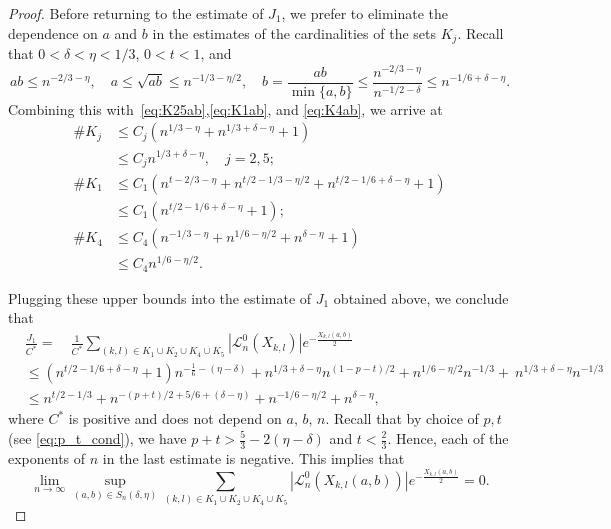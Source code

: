 \documentclass[10pt,a4paper]{amsart}
\begin{document}
\begin{proof}
    Before returning to the estimate of $J_1$, we prefer to eliminate the dependence on $a$ and $b$ in the estimates of the cardinalities of the sets $K_j$. Recall that $0<\delta<\eta<1/3$, $0<t<1$, and 
    \begin{equation}\label{eq:ab_bounds_revisited}
        ab \leq n^{-2/3-\eta}, \quad a \leq \sqrt{ab} \leq n^{-1/3 - \eta/2}, \quad b = \frac{ab}{\min\{a,b\}} \leq \frac{n^{-2/3-\eta}}{n^{-1/2-\delta}} \leq n^{-1/6+\delta - \eta}.  
    \end{equation}
    Combining this with~\eqref{eq:K25ab},\eqref{eq:K1ab}, and \eqref{eq:K4ab}, we arrive at
     \begin{equation}\label{eq:K1245}
         \begin{split}
             \#K_j &\leq C_j(n^{1/3-\eta} +n^{1/3+\delta - \eta} +1)\\
             & \leq C_j n^{1/3+\delta-\eta}, \quad j=2,5;\\
             \#K_1 & \leq C_1(n^{t-2/3-\eta} + n^{t/2 - 1/3 - \eta/2}+n^{t/2-1/6+\delta-\eta}+1)\\
             & \leq C_1(n^{t/2-1/6+\delta-\eta}+1); \\
             \#K_4 & \leq C_4(n^{-1/3-\eta} + n^{1/6 - \eta/2}+n^{\delta-\eta}+1)\\
             & \leq C_4n^{1/6-\eta/2}
             .
         \end{split}
     \end{equation}
   
    Plugging these upper bounds into the estimate of $J_1$ obtained above, we conclude that
    \begin{align}
        &\frac{J_1}{C^*} = \quad \frac{1}{C^*} \sum_{(k,l)\in K_1\cup K_2\cup K_4\cup K_5}  |\mathcal{L}^{0}_n(X_{k,l})| e^{-\frac{X_{k,l}(a,b)}{2}}\\
        & \leq (n^{t/2-1/6+\delta-\eta}+1)  n^{-\frac{1}{6}-(\eta-\delta)}
        + n^{1/3+\delta-\eta} n^{(1-p-t)/2}
        + n^{1/6-\eta/2} n^{-1/3} + \ n^{1/3+\delta-\eta} n^{-1/3}\\
        & \leq n^{t/2-1/3}+n^{-(p+t)/2+5/6+(\delta-\eta)} + n^{-1/6-\eta/2} + n^{\delta-\eta},
    \end{align}
    where  $C^*$ is positive and does not depend on $a, \, b, \, n$. Recall that by choice of $p,t$ (see \eqref{eq:p_t_cond}), we have  $p+t>\tfrac{5}{3}-2(\eta-\delta)$ and $t<\tfrac{2}{3}$. Hence, each of the exponents of $n$ in the last estimate is negative. This implies that
    \begin{equation}
        \lim\limits_{n\to\infty} \sup\limits_{(a,b) \in S_n(\delta, \eta)}\sum_{(k,l)\in K_1\cup K_2\cup K_4\cup K_5}
        |\mathcal{L}^{0}_n(X_{k,l}(a,b))| e^{-\frac{X_{k,l}(a,b)}{2}} = 0.
    \end{equation}


\end{proof}
\end{document}
